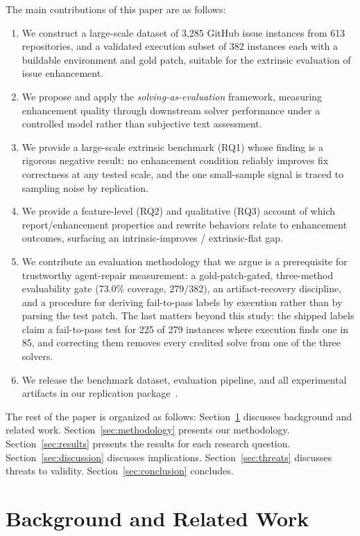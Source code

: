 \documentclass[journal]{IEEEtran}
\begin{document}
The main contributions of this paper are as follows:
\begin{enumerate}
\item We construct a large-scale dataset of 3,285 GitHub issue instances from 613 repositories, and a validated execution subset of 382 instances each with a buildable environment and gold patch, suitable for the extrinsic evaluation of issue enhancement.
\item We propose and apply the \emph{solving-as-evaluation} framework, measuring enhancement quality through downstream solver performance under a controlled model rather than subjective text assessment.
\item We provide a large-scale extrinsic benchmark (RQ1) whose finding is a rigorous negative result: no enhancement condition reliably improves fix correctness at any tested scale, and the one small-sample signal is traced to sampling noise by replication.
\item We provide a feature-level (RQ2) and qualitative (RQ3) account of which report/enhancement properties and rewrite behaviors relate to enhancement outcomes, surfacing an intrinsic-improves / extrinsic-flat gap.
\item We contribute an evaluation methodology that we argue is a prerequisite for trustworthy agent-repair measurement: a gold-patch-gated, three-method evaluability gate (73.0\% coverage, 279/382), an artifact-recovery discipline, and a procedure for deriving fail-to-pass labels by execution rather than by parsing the test patch. The last matters beyond this study: the shipped labels claim a fail-to-pass test for 225 of 279 instances where execution finds one in 85, and correcting them removes every credited solve from one of the three solvers.
\item We release the benchmark dataset, evaluation pipeline, and all experimental artifacts in our replication package~\cite{replication2026}.
\end{enumerate}

The rest of the paper is organized as follows: Section~\ref{sec:background} discusses background and related work. Section~\ref{sec:methodology} presents our methodology. Section~\ref{sec:results} presents the results for each research question. Section~\ref{sec:discussion} discusses implications. Section~\ref{sec:threats} discusses threats to validity. Section~\ref{sec:conclusion} concludes.

\section{Background and Related Work}
\label{sec:background}
\end{document}
